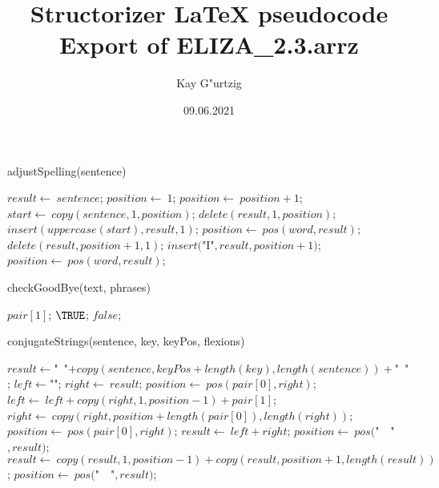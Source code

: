 \documentclass[a4paper,10pt]{article}
\title{Structorizer LaTeX pseudocode Export of ELIZA\_2.3.arrz}
\author{Kay G"urtzig}
\date{09.06.2021}
\begin{document}
\begin{algorithm}
\caption{adjustSpelling(sentence)}
\begin{algorithmic}[5]

\STATE {}
  \STATE \(result\gets\ sentence\);
  \STATE \(position\gets\ 1\);
    \STATE \(position\gets\ position+1\);
  \ENDWHILE
    \STATE \(start\gets\ copy(sentence,1,position)\);
    \STATE \(delete(result,1,position)\);
    \STATE \(insert(uppercase(start),result,1)\);
  \ENDIF
    \STATE \(position\gets\ pos(word,result)\);
      \STATE \(delete(result,position+1,1)\);
      \STATE \(insert(\)"{}I"{}\(,result,position+1)\);
      \STATE \(position\gets\ pos(word,result)\);
    \ENDWHILE
  \ENDFOR

\end{algorithmic}
\end{algorithm}


\begin{algorithm}
\caption{checkGoodBye(text, phrases)}
\begin{algorithmic}[5]

\STATE {}
\STATE {}
\STATE {}
\STATE {}
      \PRINT\(pair[1]\);
      \RETURN\(\TRUE\);
    \ENDIF
  \ENDFOR
  \RETURN\(false\);

\end{algorithmic}
\end{algorithm}


\begin{algorithm}
\caption{conjugateStrings(sentence, key, keyPos, flexions)}
\begin{algorithmic}[5]

  \STATE \(result\gets\)"{}\ "{}\(+copy(sentence,keyPos+length(key),length(sentence))+\)"{}\ "{}\(\);
    \STATE \(left\gets\)"{}"{}\(\);
    \STATE \(right\gets\ result\);
    \STATE \(position\gets\ pos(pair[0],right)\);
      \STATE \(left\gets\ left+copy(right,1,position-1)+pair[1]\);
      \STATE \(right\gets\ copy(right,position+length(pair[0]),length(right))\);
      \STATE \(position\gets\ pos(pair[0],right)\);
    \ENDWHILE
    \STATE \(result\gets\ left+right\);
  \ENDFOR
  \STATE \(position\gets\ pos(\)"{}\ \ "{}\(,result)\);
    \STATE \(result\gets\ copy(result,1,position-1)+copy(result,position+1,length(result))\);
    \STATE \(position\gets\ pos(\)"{}\ \ "{}\(,result)\);
  \ENDWHILE

\end{algorithmic}
\end{algorithm}
\end{document}
